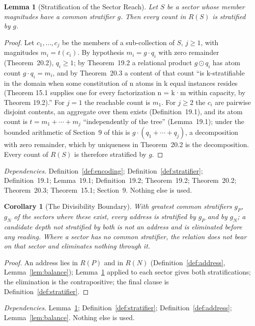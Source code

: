 \documentclass[pdflatex,sn-mathphys-num]{sn-jnl}
\theoremstyle{thmstyleone}%
\newtheorem{lemma}[theorem]{Lemma}
\newtheorem{corollary}[theorem]{Corollary}
\theoremstyle{thmstyletwo}%
\theoremstyle{thmstylethree}%
\newtheorem{lemma}[theorem]{Lemma}
\newtheorem{corollary}[theorem]{Corollary}
\newcommand{\PA}{\cite{Swanagon2026PA}}
\newcommand{\q}[1]{``#1''}        %
\newcommand{\deps}[1]{\par\begin{sloppypar}\noindent\emph{Dependencies.} #1 Nothing else is used.\end{sloppypar}}
\begin{document}
\begin{lemma}[Stratification of the Sector Reach]\label{lem:strat}
Let $S$ be a sector whose member magnitudes have a common stratifier $g$. Then every count in $R(S)$ is stratified by $g$.
\end{lemma}
\begin{proof}
Let $c_1,\dots,c_j$ be the members of a sub-collection of $S$, $j\ge1$, with magnitudes $m_i=t(c_i)$. By hypothesis $m_i=g\cdot q_i$ with zero remainder (Theorem~20.2), $q_i\ge1$; by Theorem~19.2 a relational product $g\odot q_i$ has atom count $g\cdot q_i=m_i$, and by Theorem~20.3 a content of that count \q{is k-stratifiable in the domain when some constitution of n atoms in k equal instances resides (Theorem 15.1 supplies one for every factorization n = k·m within capacity, by Theorem 19.2).} For $j=1$ the reachable count is $m_1$. For $j\ge2$ the $c_i$ are pairwise disjoint contents, an aggregate over them exists (Definition~19.1), and its atom count is $t=m_1+\cdots+m_j$ \q{independently of the tree} (Lemma~19.1); under the bounded arithmetic of Section~9 of \PA{} this is $g\cdot(q_1+\cdots+q_j)$, a decomposition with zero remainder, which by uniqueness in Theorem~20.2 is the decomposition. Every count of $R(S)$ is therefore stratified by $g$.
\end{proof}
\deps{Definition~\ref{def:encoding}; Definition~\ref{def:stratifier}; Definition~19.1; Lemma~19.1; Definition~19.2; Theorem~19.2; Theorem~20.2; Theorem~20.3; Theorem~15.1; Section~9.}

\begin{corollary}[The Divisibility Boundary]\label{cor:divisibility}
With greatest common stratifiers $g_P$, $g_N$ of the sectors where these exist, every address is stratified by $g_P$ and by $g_N$; a candidate depth not stratified by both is not an address and is eliminated before any reading. Where a sector has no common stratifier, the relation does not bear on that sector and eliminates nothing through it.
\end{corollary}
\begin{proof}
An address lies in $R(P)$ and in $R(N)$ (Definition~\ref{def:address}, Lemma~\ref{lem:balance}); Lemma~\ref{lem:strat} applied to each sector gives both stratifications; the elimination is the contrapositive; the final clause is Definition~\ref{def:stratifier}.
\end{proof}
\deps{Lemma~\ref{lem:strat}; Definition~\ref{def:stratifier}; Definition~\ref{def:address}; Lemma~\ref{lem:balance}.}
\end{document}
